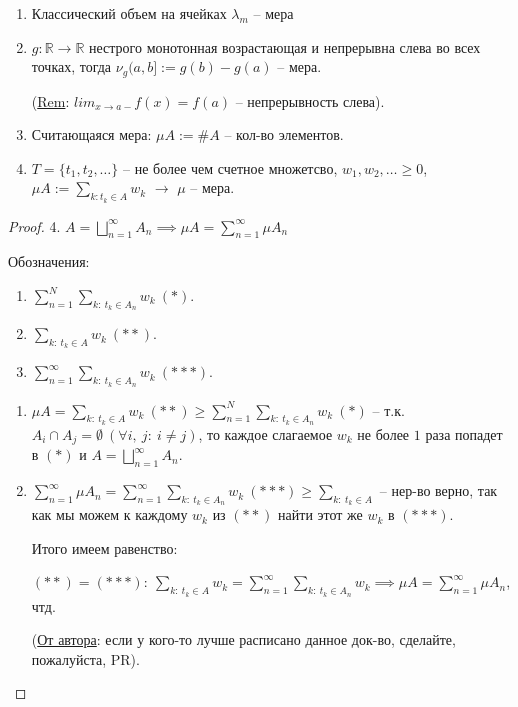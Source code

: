 \begin{example}
    \begin{enumerate}
        \item Классический объем на ячейках $\lambda_m$ -- мера
        \item {
            $g : \mathbb{R} \rightarrow \mathbb{R}$ нестрого монотонная возрастающая и непрерывна слева во всех точках, тогда $\nu_g (a, b]:=g(b) - g(a)$ -- мера.

            (\underline{Rem}: $lim_{x \rightarrow a-} f(x) = f(a)$ -- непрерывность слева).
        }
        \item Считающаяся мера: $\mu A := \#A$ -- кол-во элементов.
        \item $T = \{t_1, t_2, \dots \}$ -- не более чем счетное множетсво, $w_1, w_2, \dots \geq 0$, $\mu A := \sum_{k: t_k \in A} w_k$ $\rightarrow$ $\mu$ -- мера.
    \end{enumerate}
\end{example}

\begin{proof}
    4. $A = \bigsqcup_{n=1}^{\infty} A_n \implies \mu A = \sum_{n=1}^{\infty} \mu A_n$

    Обозначения:

    \begin{enumerate}
        \item $\sum_{n=1}^{N} \sum_{k: \ t_k \in A_n} w_k \ (*)$.
        \item $\sum_{k: \ t_k \in A} w_k \ (**)$.
        \item $\sum_{n=1}^{\infty} \sum_{k: \ t_k \in A_n} w_k \ (***)$.
    \end{enumerate}

    \begin{enumerate}
        \item {
            $\mu A = \sum_{k: \ t_k \in A} w_k \ (**) \geq \sum_{n=1}^{N} \sum_{k: \ t_k \in A_n} w_k \ (*)$ -- т.к. $A_i \cap A_j = \emptyset \ (\forall i, \ j: \ i \neq j)$, то каждое слагаемое $w_k$ не более $1$ раза попадет в $(*)$ и $A = \bigsqcup_{n=1}^{\infty} A_n$.
        }

        \item {
            $\sum_{n=1}^{\infty} \mu A_n = \sum_{n=1}^{\infty} \sum_{k: \ t_k \in A_n} w_k \ (***) \geq \sum_{k: \ t_k \in A}$ -- нер-во верно, так как мы можем к каждому $w_k$ из $(**)$ найти этот же $w_k$ в $(***)$. 
        }

        Итого имеем равенство:

        $(**) = (***): \ \sum_{k: \ t_k \in A} w_k = \sum_{n=1}^{\infty} \sum_{k: \ t_k \in A_n} w_k \implies \mu A = \sum_{n=1}^{\infty} \mu A_n$, чтд.

        (\underline{От автора}: если у кого-то лучше расписано данное док-во, сделайте, пожалуйста, PR).
    \end{enumerate}
\end{proof}

